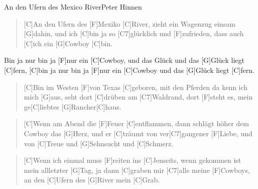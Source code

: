 \begin{song}{An den Ufern des Mexico River}{Peter Hinnen}

\begin{verse}
    [C]An den Ufern des [F]Mexiko [C]River, 
    zieht ein Wagenzug einsam [G]dahin, 
    und ich [C]bin ja so [C7]glücklich und [F]zufrieden, 
    dass auch [C]ich ein [G]Cowboy [C]bin. 
\end{verse} 

\begin{chorus}
    [C]Bin ja nur bin ja [F]nur ein [C]Cowboy, 
    und das Glück und das [G]Glück liegt [C]fern, 
    [C]bin ja nur bin ja [F]nur ein [C]Cowboy 
    und das [G]Glück liegt [C]fern.
\end{chorus}

\begin{verse}
    [C]Bin im Westen [F]von Texas [C]geboren, 
    mit den Pferden da kenn ich mich [G]aus, 
    seht dort [C]drüben am [C7]Waldrand, dort [F]steht es, 
    mein ge[C]liebtes [G]Rancher[C]haus. 
\end{verse}

\begin{verse}
    [C]Wenn am Abend die [F]Feuer [C]entflammen, 
    dann schlägt höher dem Cowboy das [G]Herz, 
    und er [C]träumt von ver[C7]gangener [F]Liebe, 
    und von [C]Treue und [G]Sehnsucht und [C]Schmerz. 
\end{verse}

\begin{verse}
    [C]Wenn ich einmal muss [F]reiten ins [C]Jenseits, 
    wenn gekommen ist mein allletzter [G]Tag, 
    ja dann [C]graben mir [C7]alle meine [F]Cowboys, 
    an den [C]Ufern des [G]River mein [C]Grab. 
\end{verse}

\end{song}

